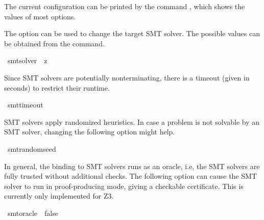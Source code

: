\begin{isabellebody}
%
\begin{isamarkuptext}%
The current configuration can be printed by the command
, which shows the values of most options.%
\end{isamarkuptext}\isamarkuptrue%
%
\isadelimdocument
%
\endisadelimdocument
%
\isatagdocument
%
\isamarkuptrue%
%
\endisatagdocument
{\isafolddocument}%
%
\isadelimdocument
%
\endisadelimdocument
%
\begin{isamarkuptext}%
The option  can be used to change the target SMT
solver. The possible values can be obtained from the 
command.%
\end{isamarkuptext}\isamarkuptrue%
\isamarkupfalse%
\ {\isacharbrackleft}{\kern0pt}{\isacharbrackleft}{\kern0pt}smt{\isacharunderscore}{\kern0pt}solver\ {\isacharequal}{\kern0pt}\ z{}{\isacharbrackright}{\kern0pt}{\isacharbrackright}{\kern0pt}%
\begin{isamarkuptext}%
Since SMT solvers are potentially nonterminating, there is a timeout
(given in seconds) to restrict their runtime.%
\end{isamarkuptext}\isamarkuptrue%
\isamarkupfalse%
\ {\isacharbrackleft}{\kern0pt}{\isacharbrackleft}{\kern0pt}smt{\isacharunderscore}{\kern0pt}timeout\ {\isacharequal}{\kern0pt}\ {}{\isacharbrackright}{\kern0pt}{\isacharbrackright}{\kern0pt}%
\begin{isamarkuptext}%
SMT solvers apply randomized heuristics. In case a problem is not
solvable by an SMT solver, changing the following option might help.%
\end{isamarkuptext}\isamarkuptrue%
\isamarkupfalse%
\ {\isacharbrackleft}{\kern0pt}{\isacharbrackleft}{\kern0pt}smt{\isacharunderscore}{\kern0pt}random{\isacharunderscore}{\kern0pt}seed\ {\isacharequal}{\kern0pt}\ {}{\isacharbrackright}{\kern0pt}{\isacharbrackright}{\kern0pt}%
\begin{isamarkuptext}%
In general, the binding to SMT solvers runs as an oracle, i.e, the SMT
solvers are fully trusted without additional checks. The following
option can cause the SMT solver to run in proof-producing mode, giving
a checkable certificate. This is currently only implemented for Z3.%
\end{isamarkuptext}\isamarkuptrue%
\isamarkupfalse%
\ {\isacharbrackleft}{\kern0pt}{\isacharbrackleft}{\kern0pt}smt{\isacharunderscore}{\kern0pt}oracle\ {\isacharequal}{\kern0pt}\ false{\isacharbrackright}{\kern0pt}{\isacharbrackright}{\kern0pt}%

\end{isabellebody}
